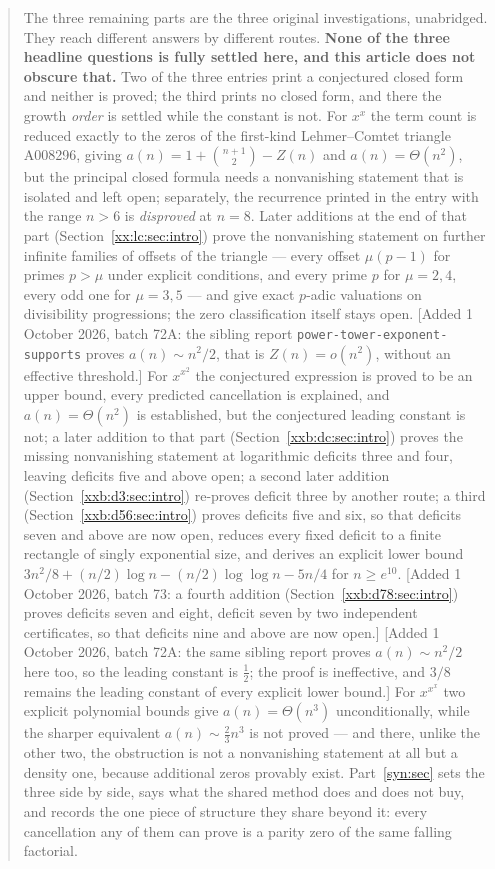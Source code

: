 \documentclass[11pt,a4paper]{article}
\numberwithin{equation}{section}
\theoremstyle{definition}
\theoremstyle{remark}
\theoremstyle{plain}
\newcommand{\sibPTE}{\texttt{power-\allowbreak{}tower-\allowbreak{}exponent-\allowbreak{}supports}}
\begin{document}
\begin{abstract}
The three remaining parts are the three original investigations, unabridged.
They reach different answers by different routes.  \textbf{None of the three
headline questions is fully settled here, and this article does not obscure
that.}  Two of the three entries print a conjectured closed form and neither is
proved; the third prints no closed form, and there the growth \emph{order} is
settled while the constant is not.  For $x^x$ the
term count is reduced exactly to the zeros of the first-kind Lehmer--Comtet
triangle A008296, giving $a(n)=1+\binom{n+1}{2}-Z(n)$ and $a(n)=\Theta(n^2)$,
but the principal closed formula needs a nonvanishing statement that is isolated
and left open; separately, the recurrence printed in the entry with the range
$n>6$ is \emph{disproved} at $n=8$.  Later additions at the end of that part
(Section~\ref{xx:lc:sec:intro}) prove the nonvanishing statement on further
infinite families of offsets of the triangle --- every offset $\mu(p-1)$ for
primes $p>\mu$ under explicit conditions, and every prime $p$ for $\mu=2,4$,
every odd one for $\mu=3,5$ --- and
give exact $p$-adic valuations on divisibility progressions; the zero
classification itself stays open.  [Added 1 October 2026, batch 72A: the sibling report \sibPTE{} proves $a(n)\sim n^2/2$,
that is $Z(n)=o(n^2)$, without an effective threshold.]  For $x^{x^2}$ the conjectured expression is
proved to be an upper bound, every predicted cancellation is explained, and
$a(n)=\Theta(n^2)$ is established, but the conjectured leading constant is not;
a later addition to that part (Section~\ref{xxb:dc:sec:intro}) proves the
missing nonvanishing statement at logarithmic deficits three and four, leaving
deficits five and above open; a second later addition
(Section~\ref{xxb:d3:sec:intro}) re-proves deficit three by another route; a
third (Section~\ref{xxb:d56:sec:intro}) proves deficits five and six, so that
deficits seven and above are now open, reduces every fixed deficit to a
finite rectangle of singly exponential size, and derives an explicit lower
bound $3n^2/8+(n/2)\log n-(n/2)\log\log n-5n/4$ for $n\ge e^{10}$.
[Added 1 October 2026, batch 73: a fourth addition (Section~\ref{xxb:d78:sec:intro}) proves
deficits seven and eight, deficit seven by two independent certificates, so
that deficits nine and above are now open.]
[Added 1 October 2026, batch 72A: the same sibling report proves $a(n)\sim n^2/2$ here too, so the
leading constant is $\tfrac12$; the proof is ineffective, and $3/8$ remains the
leading constant of every explicit lower bound.]
For $x^{x^x}$ two explicit polynomial bounds give $a(n)=\Theta(n^3)$
unconditionally, while the sharper equivalent $a(n)\sim\tfrac23n^3$ is not
proved --- and there, unlike the other two, the obstruction is not a
nonvanishing statement at all but a density one, because additional zeros
provably exist.  Part~\ref{syn:sec} sets the three side by side, says what the
shared method does and does not buy, and records the one piece of structure they
share beyond it: every cancellation any of them can prove is a parity zero of
the same falling factorial.


\end{abstract}
\end{document}
